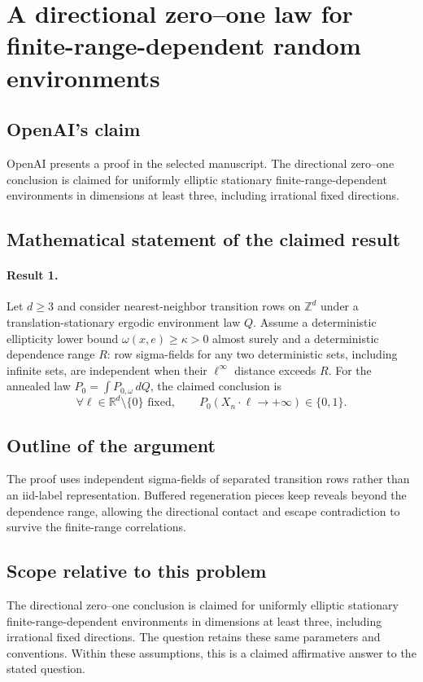 \documentclass[11pt]{article}
\begin{document}
\section*{A directional zero–one law for finite-range-dependent random environments}

\subsection{OpenAI's claim}
OpenAI presents a proof in the selected manuscript. The directional zero--one conclusion is claimed for uniformly elliptic stationary finite-range-dependent environments in dimensions at least three, including irrational fixed directions.

\subsection{Mathematical statement of the claimed result}
\paragraph{Result 1.} Let \(d\ge3\) and consider nearest-neighbor transition rows on \(\mathbb Z^d\) under a translation-stationary ergodic environment law \(Q\). Assume a deterministic ellipticity lower bound \(\omega(x,e)\ge\kappa>0\) almost surely and a deterministic dependence range \(R\): row sigma-fields for any two deterministic sets, including infinite sets, are independent when their \(\ell^\infty\) distance exceeds \(R\). For the annealed law \(P_0=\int P_{0,\omega}\,dQ\), the claimed conclusion is
\[
 \forall\ell\in\mathbb R^d\setminus\{0\}\text{ fixed},\qquad
 P_0(X_n\cdot\ell\to+\infty)\in\{0,1\}.
\]

\subsection{Outline of the argument}
The proof uses independent sigma-fields of separated transition rows rather than an iid-label representation. Buffered regeneration pieces keep reveals beyond the dependence range, allowing the directional contact and escape contradiction to survive the finite-range correlations.

\subsection{Scope relative to this problem}
The directional zero--one conclusion is claimed for uniformly elliptic stationary finite-range-dependent environments in dimensions at least three, including irrational fixed directions. The question retains these same parameters and conventions. Within these assumptions, this is a claimed affirmative answer to the stated question.
\end{document}
